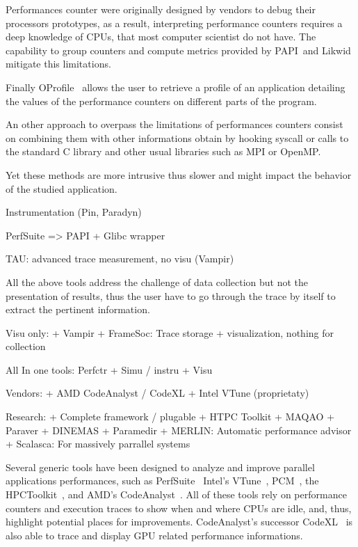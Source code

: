 
Performances counter were originally designed by vendors to debug their
processors prototypes, as a result, interpreting performance counters requires
a deep knowledge of \glspl{CPU}, that most computer scientist do not have. The
capability to group counters and compute metrics provided by \gls{PAPI} and
\gls{Likwid} mitigate this limitations.



Finally \gls{OProfile}~\cite{Oprofile}
allows the user to retrieve a profile of an application detailing the values
of the performance counters on different parts of the program.

An other approach to overpass the limitations of performances counters consist
on combining them with other informations obtain by hooking syscall or
calls to the standard C library and other usual libraries such as MPI or
OpenMP.

Yet these methods are more intrusive thus slower and might
impact the behavior of the studied application.



Instrumentation (Pin, Paradyn)

PerfSuite => PAPI + Glibc wrapper


TAU: advanced trace measurement, no visu (Vampir)


All the above tools address the challenge of data collection but not the
presentation of results, thus the user have to go through the trace by itself
to extract the pertinent information.


Visu only:
    + Vampir
    + FrameSoc: Trace storage + visualization, nothing for collection

All In one tools: Perfctr + Simu / instru + Visu

Vendors:
    + AMD CodeAnalyst / CodeXL
    + Intel VTune (proprietaty)

Research:
    + Complete framework / plugable
        + HTPC Toolkit
        + MAQAO
        + Paraver
            + DINEMAS
            + Paramedir
    + MERLIN: Automatic performance advisor
    + Scalasca: For massively parrallel systems

Several generic tools have been designed to analyze and improve parallel
applications performances, such as \gls{PerfSuite}~\cite{Kufrin05Perfsuite}
\gls{Intel}'s \gls{VTune}~\cite{Reinders05VTune},
\gls{PCM}~\cite{Wilhalm16Intel}, the
\gls{HPCToolkit}~\cite{Adhianto10HPCTOOLKIT}, and \gls{AMD}'s
\gls{CodeAnalyst}~\cite{Drongowski08introduction}. All of these tools rely on
performance counters and execution traces to show when and where CPUs are
idle, and, thus, highlight potential places for improvements.
\gls{CodeAnalyst}'s successor \gls{CodeXL}~\cite{AMDCodeXL} is also able to
trace and display \gls{GPU} related performance informations.

